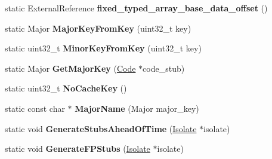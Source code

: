 \begin{DoxyCompactItemize}
\item 
static External\+Reference {\bfseries fixed\+\_\+typed\+\_\+array\+\_\+base\+\_\+data\+\_\+offset} ()\hypertarget{classv8_1_1internal_1_1_b_a_s_e___e_m_b_e_d_d_e_d_a4cda05b257c93c8076696932b51623a2}{}\label{classv8_1_1internal_1_1_b_a_s_e___e_m_b_e_d_d_e_d_a4cda05b257c93c8076696932b51623a2}

\item 
static Major {\bfseries Major\+Key\+From\+Key} (uint32\+\_\+t key)\hypertarget{classv8_1_1internal_1_1_b_a_s_e___e_m_b_e_d_d_e_d_a9ebb22a60a7b1ed6ed3a17a50953eac0}{}\label{classv8_1_1internal_1_1_b_a_s_e___e_m_b_e_d_d_e_d_a9ebb22a60a7b1ed6ed3a17a50953eac0}

\item 
static uint32\+\_\+t {\bfseries Minor\+Key\+From\+Key} (uint32\+\_\+t key)\hypertarget{classv8_1_1internal_1_1_b_a_s_e___e_m_b_e_d_d_e_d_af97f6593e841fd3293294b8418e98636}{}\label{classv8_1_1internal_1_1_b_a_s_e___e_m_b_e_d_d_e_d_af97f6593e841fd3293294b8418e98636}

\item 
static Major {\bfseries Get\+Major\+Key} (\hyperlink{classv8_1_1internal_1_1_code}{Code} $\ast$code\+\_\+stub)\hypertarget{classv8_1_1internal_1_1_b_a_s_e___e_m_b_e_d_d_e_d_a4534ce76b71b720ba6836c74adfe6969}{}\label{classv8_1_1internal_1_1_b_a_s_e___e_m_b_e_d_d_e_d_a4534ce76b71b720ba6836c74adfe6969}

\item 
static uint32\+\_\+t {\bfseries No\+Cache\+Key} ()\hypertarget{classv8_1_1internal_1_1_b_a_s_e___e_m_b_e_d_d_e_d_a605583f60a5c6a03d7e7de3a92c6f315}{}\label{classv8_1_1internal_1_1_b_a_s_e___e_m_b_e_d_d_e_d_a605583f60a5c6a03d7e7de3a92c6f315}

\item 
static const char $\ast$ {\bfseries Major\+Name} (Major major\+\_\+key)\hypertarget{classv8_1_1internal_1_1_b_a_s_e___e_m_b_e_d_d_e_d_a3ec437b0d171d7f076990c0a6a445dab}{}\label{classv8_1_1internal_1_1_b_a_s_e___e_m_b_e_d_d_e_d_a3ec437b0d171d7f076990c0a6a445dab}

\item 
static void {\bfseries Generate\+Stubs\+Ahead\+Of\+Time} (\hyperlink{classv8_1_1internal_1_1_isolate}{Isolate} $\ast$isolate)\hypertarget{classv8_1_1internal_1_1_b_a_s_e___e_m_b_e_d_d_e_d_acd9db78eb46578027441dd1614926747}{}\label{classv8_1_1internal_1_1_b_a_s_e___e_m_b_e_d_d_e_d_acd9db78eb46578027441dd1614926747}

\item 
static void {\bfseries Generate\+F\+P\+Stubs} (\hyperlink{classv8_1_1internal_1_1_isolate}{Isolate} $\ast$isolate)\hypertarget{classv8_1_1internal_1_1_b_a_s_e___e_m_b_e_d_d_e_d_a935e3a7f303563e1dae5cd79f8c4941e}{}\label{classv8_1_1internal_1_1_b_a_s_e___e_m_b_e_d_d_e_d_a935e3a7f303563e1dae5cd79f8c4941e}


\end{DoxyCompactItemize}
